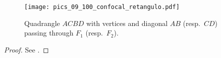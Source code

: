  \begin{figure} 
 	\begin{center}
 	 \texttt{[image: pics\_09\_100\_confocal\_retangulo.pdf]}
 		\caption {Quadrangle $ACBD$ with vertices and diagonal  $AB$ (resp.\ $CD$) passing through $F_1$ (resp.\   $F_2$).
 		 \label{fig:retangulo_EH} }
 	\end{center}

 \end{figure}

 \begin{proof}
 See \cite{dolgirev2014}.
\end{proof}

 